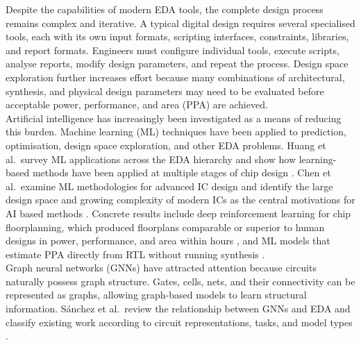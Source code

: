 \documentclass[conference]{IEEEtran}
\begin{document}
\noindent Despite the capabilities of modern EDA tools, the complete design process remains complex and iterative. A typical digital design requires several specialised tools, each with its own input formats, scripting interfaces, constraints, libraries, and report formats. Engineers must configure individual tools, execute scripts, analyse reports, modify design parameters, and repeat the process. Design space exploration further increases effort because many combinations of architectural, synthesis, and physical design parameters may need to be evaluated before acceptable power, performance, and area (PPA) are achieved.\\

\noindent Artificial intelligence has increasingly been investigated as a means of reducing this burden. Machine learning (ML) techniques have been applied to prediction, optimisation, design space exploration, and other EDA problems. Huang et al.\ survey ML applications across the EDA hierarchy and show how learning-based methods have been applied at multiple stages of chip design \cite{P1_Huang2021}. Chen et al.\ examine ML methodologies for advanced IC design and identify the large design space and growing complexity of modern ICs as the central motivations for AI based methods \cite{P2_Chen2023}. Concrete results include deep reinforcement learning for chip floorplanning, which produced floorplans comparable or superior to human designs in power, performance, and area within hours \cite{P8_Mirhoseini2021}, and ML models that estimate PPA directly from RTL without running synthesis \cite{P10_Fang2023}.\\

\noindent Graph neural networks (GNNs) have attracted attention because circuits naturally possess graph structure. Gates, cells, nets, and their connectivity can be represented as graphs, allowing graph-based models to learn structural information. S{\'a}nchez et al.\ review the relationship between GNNs and EDA and classify existing work according to circuit representations, tasks, and model types \cite{P3_Snchez2023}.\\
\end{document}
